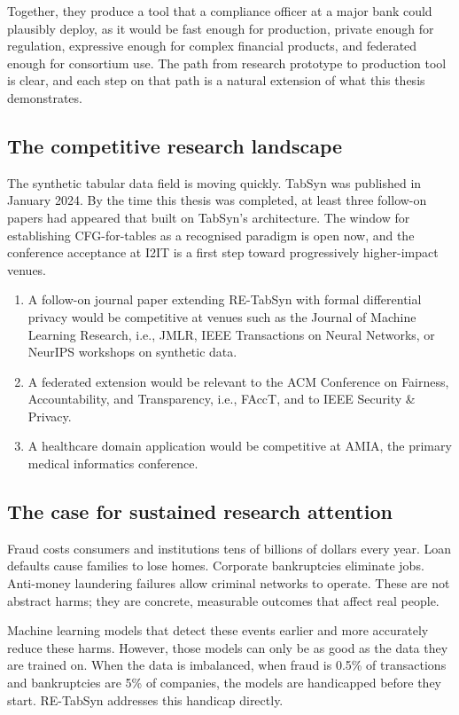 Together, they produce a tool that a compliance officer at a major bank could plausibly deploy, as it would be fast enough for production, private enough for regulation, expressive enough for complex financial products, and federated enough for consortium use. The path from research prototype to production tool is clear, and each step on that path is a natural extension of what this thesis demonstrates.

\subsection{The competitive research landscape}

The synthetic tabular data field is moving quickly. TabSyn was published in January 2024. By the time this thesis was completed, at least three follow-on papers had appeared that built on TabSyn's architecture. The window for establishing CFG-for-tables as a recognised paradigm is open now, and the conference acceptance at I2IT is a first step toward progressively higher-impact venues.
\begin{enumerate}
    \item A follow-on journal paper extending RE-TabSyn with formal differential privacy would be competitive at venues such as the Journal of Machine Learning Research, i.e., JMLR, IEEE Transactions on Neural Networks, or NeurIPS workshops on synthetic data.
    \item A federated extension would be relevant to the ACM Conference on Fairness, Accountability, and Transparency, i.e., FAccT, and to IEEE Security \& Privacy.
    \item A healthcare domain application would be competitive at AMIA, the primary medical informatics conference.
\end{enumerate}

\subsection{The case for sustained research attention}

Fraud costs consumers and institutions tens of billions of dollars every year. Loan defaults cause families to lose homes. Corporate bankruptcies eliminate jobs. Anti-money laundering failures allow criminal networks to operate. These are not abstract harms; they are concrete, measurable outcomes that affect real people.

Machine learning models that detect these events earlier and more accurately reduce these harms. However, those models can only be as good as the data they are trained on. When the data is imbalanced, when fraud is 0.5\% of transactions and bankruptcies are 5\% of companies, the models are handicapped before they start. RE-TabSyn addresses this handicap directly.

